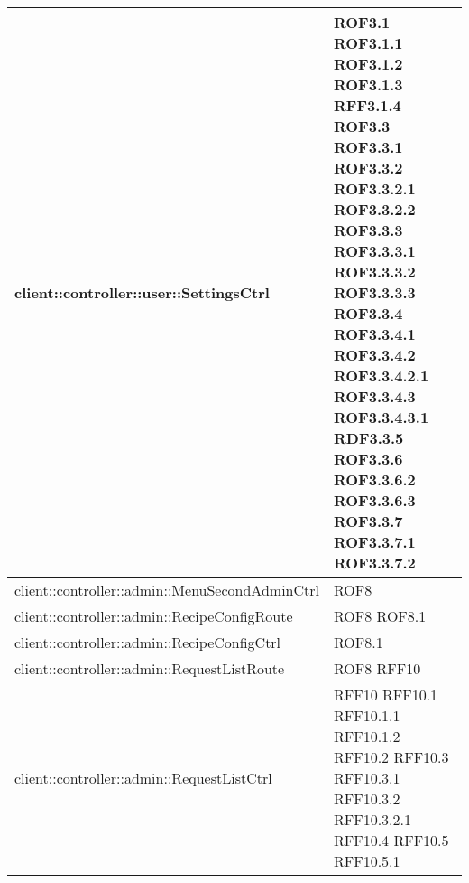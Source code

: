 \begin{center}
\begin{longtable}{| p{11cm} | p{2.5cm} |}
client::controller::user::SettingsCtrl & ROF3.1 \newline ROF3.1.1 \newline ROF3.1.2 \newline ROF3.1.3 \newline RFF3.1.4 \newline ROF3.3 \newline ROF3.3.1 \newline ROF3.3.2 \newline ROF3.3.2.1 \newline ROF3.3.2.2 \newline ROF3.3.3 \newline ROF3.3.3.1 \newline ROF3.3.3.2 \newline ROF3.3.3.3 \newline ROF3.3.4 \newline ROF3.3.4.1 \newline ROF3.3.4.2 \newline ROF3.3.4.2.1 \newline ROF3.3.4.3 \newline ROF3.3.4.3.1 \newline RDF3.3.5 \newline ROF3.3.6 \newline ROF3.3.6.2 \newline ROF3.3.6.3 \newline ROF3.3.7 \newline ROF3.3.7.1 \newline ROF3.3.7.2 \\
\hline
client::controller::admin::MenuSecondAdminCtrl & ROF8 \\
\hline
client::controller::admin::RecipeConfigRoute & ROF8 \newline ROF8.1 \\
\hline
client::controller::admin::RecipeConfigCtrl & ROF8.1 \\
\hline
client::controller::admin::RequestListRoute & ROF8 \newline RFF10 \\
\hline
client::controller::admin::RequestListCtrl & RFF10 \newline RFF10.1 \newline RFF10.1.1 \newline RFF10.1.2 \newline RFF10.2 \newline RFF10.3 \newline RFF10.3.1 \newline RFF10.3.2 \newline RFF10.3.2.1 \newline RFF10.4 \newline RFF10.5 \newline RFF10.5.1 \\

\end{longtable}
\end{center}
